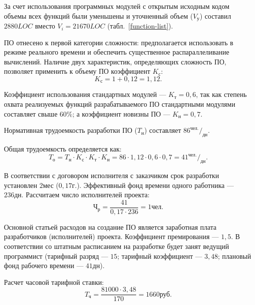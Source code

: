 За счет использования программных модулей с открытым исходным кодом объемы всех функций были уменьшены и уточненный объем (\( V_{\text{у}} \)) составил \( 2880 LOC \) вместо \( V_i = 21670 LOC \) (табл.~\ref{function-list}).

ПО отнесено к первой категории сложности: предполагается использовать в режиме реального времени и обеспечить существенное распараллеливание вычислений. Наличие двух характеристик, определяющих сложность ПО, позволяет применить к объему ПО коэффициент \( K_{\text{с}} \):
\begin{displaymath}
  K_{\text{с}} = 1 + 0,12 = 1,12.
\end{displaymath}

Коэффициент использования стандартных модулей --- \( K_{\text{т}} = 0,6 \), так как степень охвата реализуемых функций разрабатываемого ПО стандартными модулями составляет свыше \( 60\% \); а коэффициент новизны ПО --- \( K_{\text{н}} = 0,7 \).

Нормативная трудоемкость разработки ПО (\( T_{\text{н}} \)) составляет \( 86 ^{\text{чел.}}/_{\text{дн}} \).

Общая трудоемкость определяется как:
\begin{displaymath}
  T_{\text{о}} = T_{\text{н}} \cdot K_{\text{с}} \cdot K_{\text{т}} \cdot K_{\text{н}} = 86 \cdot 1,12 \cdot 0,6 \cdot 0,7 = 41 ^{\text{чел.}}/_{\text{дн}}.
\end{displaymath}

В соответствии с договором исполнителя с заказчиком срок разработки установлен \( 2 \text{мес} \) (\( 0,17 \text{г.} \)). Эффективный фонд времени одного работника --- \( 236 \text{дн.} \) Рассчитаем число исполнителей проекта:
\begin{displaymath}
  \text{Ч}_{\text{р}} = \frac{41}{0,17 \cdot 236} = 1 \text{чел}.
\end{displaymath}

Основной статьей расходов на создание ПО является заработная плата разработчиков (исполнителей) проекта. Коэффициент премирования --- \( 1,5 \). В соответствии со штатным расписанием на разработке будет занят ведущий программист (тарифный разряд --- \( 15 \); тарифный коэффициент --- \( 3,48 \); плановый фонд рабочего времени --- \( 41 \text{дн} \)).

Расчет часовой тарифной ставки:
\begin{displaymath}
  T_{\text{ч}} = \frac{81000 \cdot 3,48}{170} = 1660 \text{руб}.
\end{displaymath}

